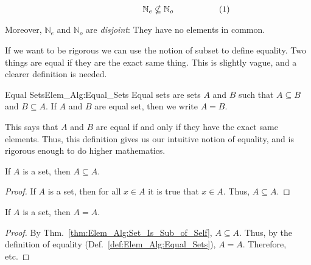 \documentclass[crop=false,class=book,oneside]{standalone}                      %
\begin{document}
\begin{lexample}
\begin{subequations}
                    \hfill
                    \begin{minipage}{0.49\textwidth}
                        \centering
                        \begin{equation}
                            \mathbb{N}_{e}\nsubseteq\mathbb{N}_{o}
                        \end{equation}
                    \end{minipage}
                \end{subequations}
                \par\vspace{2.5ex}
                Moreover, $\mathbb{N}_{e}$ and $\mathbb{N}_{o}$ are
                \textit{disjoint}: They have no elements in common.
            \end{lexample}
            If we want to be rigorous we can use the notion of
            subset to define equality. Two things are equal if they
            are the exact same thing. This is slightly vague, and a
            clearer definition is needed.
            \begin{ldefinition}{Equal Sets}{Elem_Alg:Equal_Sets}
                Equal sets are sets $A$ and $B$ such that
                $A\subseteq{B}$ and $B\subseteq{A}$. If $A$ and $B$
                are equal set, then we write $A=B$.
            \end{ldefinition}
            This says that $A$ and $B$ are equal if and only if
            they have the exact same elements. Thus, this definition
            gives us our intuitive notion of equality, and is
            rigorous enough to do higher mathematics.
            \begin{theorem}
                \label{thm:Elem_Alg:Set_Is_Sub_of_Self}%
                If $A$ is a set, then $A\subseteq{A}$.
            \end{theorem}
            \begin{proof}
                If $A$ is a set, then for all
                $x\in{A}$ it is true that $x\in{A}$.
                Thus, $A\subseteq{A}$.
            \end{proof}
            \begin{theorem}
                If $A$ is a set, then $A=A$.
            \end{theorem}
            \begin{proof}
                By Thm.~\ref{thm:Elem_Alg:Set_Is_Sub_of_Self},
                $A\subseteq{A}$. Thus, by the definition of
                equality (Def.~\ref{def:Elem_Alg:Equal_Sets}),
                $A=A$. Therefore, etc.
            \end{proof}
\end{document}
